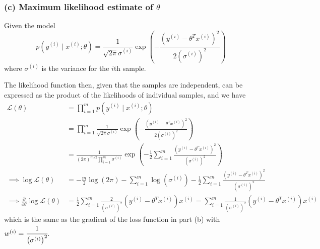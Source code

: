 \subsubsection*{(c) Maximum likelihood estimate of \( \theta \)}

Given the model
\begin{equation*}
    p\left(y^{(i)} \mid x^{(i)} ; \theta\right)=\frac{1}{\sqrt{2 \pi} \sigma^{(i)}} \exp \left(-\frac{{\left(y^{(i)}-\theta^{T} x^{(i)}\right)}^{2}}{2{\left(\sigma^{(i)}\right)}^{2}}\right)
\end{equation*}
where \( \sigma^{(i)} \) is the variance for the \( i \)th sample.

The likelihood function then, given that the samples are independent, can be expressed as the product of the likelihoods of individual samples, and we have
\begin{align*}
    \mathcal{L}(\theta)
     & =
    \prod_{i=1}^{m}
    p\left(y^{(i)} \mid x^{(i)} ; \theta\right)
    \\ & =
    \prod_{i=1}^{m}
    \frac{1}{\sqrt{2 \pi} \sigma^{(i)}} \exp \left(-\frac{{\left(y^{(i)}-\theta^{T} x^{(i)}\right)}^{2}}{2{\left(\sigma^{(i)}\right)}^{2}}\right)
    \\ & =
    \frac{1}{\left(2 \pi\right)^{m/2} \prod_{i=1}^{m} \sigma^{(i)}}
    \exp \left(
    -\frac{1}{2}
    \sum_{i=1}^{m}
    \frac{{\left(y^{(i)}-\theta^{T} x^{(i)}\right)}^{2}}{{\left(\sigma^{(i)}\right)}^{2}}
    \right)
    \\
    \implies
    \log \mathcal{L}(\theta)
     & =
    -\frac{m}{2} \log(2 \pi) - \sum_{i=1}^{m} \log \left( \sigma^{(i)} \right)
    -\frac{1}{2}
    \sum_{i=1}^{m}
    \frac{{\left(y^{(i)}-\theta^{T} x^{(i)}\right)}^{2}}{{\left(\sigma^{(i)}\right)}^{2}}
    \\
    \implies
    \frac{\partial}{\partial \theta} \log \mathcal{L}(\theta)
     & =
    \frac{1}{2}
    \sum_{i=1}^{m}
    \frac{2}{\left(\sigma^{(i)}\right)^{2}}
    \left(y^{(i)}-\theta^{T} x^{(i)}\right)
    x^{(i)}
    =
    \sum_{i=1}^{m}
    \frac{1}{\left(\sigma^{(i)}\right)^{2}}
    \left(y^{(i)}-\theta^{T} x^{(i)}\right)
    x^{(i)}
\end{align*}
which is the same as the gradient of the loss function in part (b) with \( w^{(i)} = \cfrac{1}{\left(\sigma^{(i)}\right)^{2}} \).
